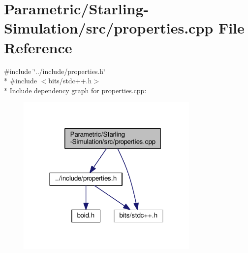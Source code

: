 \hypertarget{_parametric_2_starling-_simulation_2src_2properties_8cpp}{}\section{Parametric/\+Starling-\/\+Simulation/src/properties.cpp File Reference}
\label{_parametric_2_starling-_simulation_2src_2properties_8cpp}
{\ttfamily \#include \char`\"{}../include/properties.\+h\char`\"{}}\\*
{\ttfamily \#include $<$bits/stdc++.\+h$>$}\\*
Include dependency graph for properties.\+cpp\+:
\nopagebreak
\begin{figure}[H]
\begin{center}
\leavevmode
\includegraphics[width=252pt]{_parametric_2_starling-_simulation_2src_2properties_8cpp__incl}
\end{center}
\end{figure}
